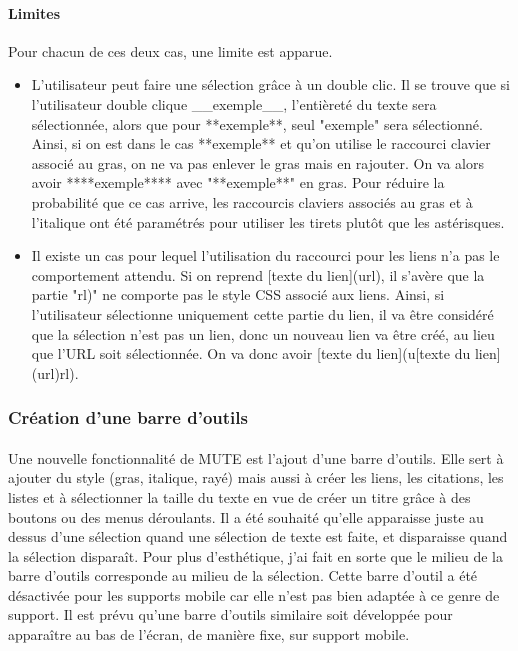 \documentclass[12pt]{article}
\begin{document}
\paragraph{Limites}
Pour chacun de ces deux cas, une limite est apparue.
\begin{itemize}
    \item L'utilisateur peut faire une sélection grâce à un double clic.  Il se trouve que si l'utilisateur double clique \_\_exemple\_\_, l'entièreté du texte sera sélectionnée, alors que pour **exemple**, seul "exemple" sera sélectionné. Ainsi, si on est dans le cas **exemple** et qu'on utilise le raccourci clavier associé au gras, on ne va pas enlever le gras mais en rajouter. On va alors avoir ****exemple**** avec "**exemple**" en gras. Pour réduire la probabilité que ce cas arrive, les raccourcis claviers associés au gras et à l'italique ont été paramétrés pour utiliser les tirets plutôt que les astérisques.
    \item Il existe un cas pour lequel l'utilisation du raccourci pour les liens n'a pas le comportement attendu. Si on reprend [texte du lien](url), il s'avère que la partie "rl)" ne comporte pas le style CSS associé aux liens. Ainsi, si l'utilisateur sélectionne uniquement cette partie du lien, il va être considéré que la sélection n'est pas un lien, donc un nouveau lien va être créé, au lieu que l'URL soit sélectionnée. On va donc avoir [texte du lien](u[texte du lien](url)rl).
\end{itemize}

\subsubsection{Création d'une barre d'outils}
\paragraph{}
Une nouvelle fonctionnalité de MUTE est l'ajout d'une barre d'outils. Elle sert à ajouter du style (gras, italique, rayé) mais aussi à créer les liens, les citations, les listes et à sélectionner la taille du texte en vue de créer un titre grâce à des boutons ou des menus déroulants. Il a été souhaité qu'elle apparaisse juste au dessus d'une sélection quand une sélection de texte est faite, et disparaisse quand la sélection disparaît. Pour plus d'esthétique, j'ai fait en sorte que le milieu de la barre d'outils corresponde au milieu de la sélection. Cette barre d'outil a été désactivée pour les supports mobile car elle n'est pas bien adaptée à ce genre de support. Il est prévu qu'une barre d'outils similaire soit développée pour apparaître au bas de l'écran, de manière fixe, sur support mobile.
\end{document}
